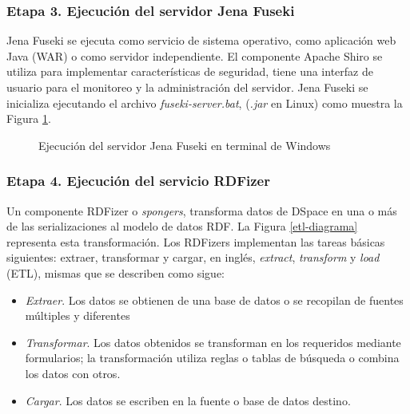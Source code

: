 \subsubsection{Etapa 3. Ejecuci\'on del servidor Jena Fuseki}

Jena Fuseki se ejecuta como servicio de sistema operativo, como aplicaci\'on web Java (WAR) o como servidor independiente. El componente Apache Shiro se utiliza para implementar caracter\'isticas de seguridad, tiene una interfaz de usuario para el monitoreo y la administraci\'on del servidor. Jena Fuseki se inicializa ejecutando el archivo \textit{fuseki-server.bat}, (\textit{.jar} en Linux) como muestra la Figura \ref{ejecucionFuseki}.\newline

\begin{figure}[!ht]
	\centering
    \caption{Ejecuci\'on del servidor Jena Fuseki en terminal de Windows}
    \label{ejecucionFuseki}
\end{figure}

\subsubsection{Etapa 4. Ejecuci\'on del servicio RDFizer}

Un componente RDFizer\cite{RDFizer} o \textit{spongers}, transforma datos de DSpace en una o m\'as de las serializaciones al modelo de datos RDF. La Figura \ref{etl-diagrama} representa esta transformaci\'on. Los RDFizers implementan  las tareas b\'asicas siguientes: extraer, transformar y cargar, en ingl\'es, \emph{extract}, \emph{transform} y \emph{load} (ETL), mismas que se describen como sigue: 

\begin{itemize}
    \item \textit{Extraer}. Los datos se obtienen de una base de datos o se recopilan de fuentes m\'ultiples y diferentes
    
    \item \textit{Transformar}. Los datos obtenidos se transforman en los requeridos mediante formularios; la transformaci\'on utiliza reglas o tablas de b\'usqueda o combina los datos con otros.
    
    \item \textit{Cargar}. Los datos se escriben en la fuente o base de datos destino. 
\end{itemize}

